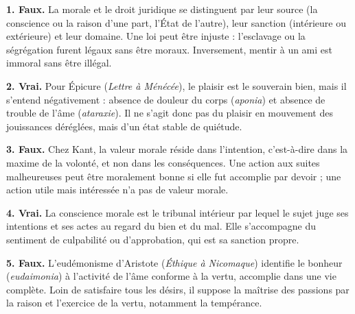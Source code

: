 \documentclass[11pt]{article}
\newcommand{\cle}[1]{{\popxbold\color{popdark}#1}}
\begin{document}
\begin{corrige}

\textbf{1. Faux.} La \cle{morale} et le \cle{droit} juridique se distinguent par leur source (la conscience ou la raison d'une part, l'État de l'autre), leur sanction (intérieure ou extérieure) et leur domaine. Une loi peut être injuste : l'esclavage ou la ségrégation furent légaux sans être moraux. Inversement, mentir à un ami est immoral sans être illégal.

\textbf{2. Vrai.} Pour Épicure (\emph{Lettre à Ménécée}), le \cle{plaisir} est le souverain bien, mais il s'entend négativement : absence de douleur du corps (\emph{aponia}) et absence de trouble de l'âme (\emph{ataraxie}). Il ne s'agit donc pas du plaisir en mouvement des jouissances déréglées, mais d'un état stable de quiétude.

\textbf{3. Faux.} Chez Kant, la valeur morale réside dans l'\cle{intention}, c'est-à-dire dans la \cle{maxime} de la volonté, et non dans les conséquences. Une action aux suites malheureuses peut être moralement bonne si elle fut accomplie par devoir ; une action utile mais intéressée n'a pas de valeur morale.

\textbf{4. Vrai.} La \cle{conscience morale} est le tribunal intérieur par lequel le sujet juge ses intentions et ses actes au regard du bien et du mal. Elle s'accompagne du sentiment de culpabilité ou d'approbation, qui est sa sanction propre.

\textbf{5. Faux.} L'\cle{eudémonisme} d'Aristote (\emph{Éthique à Nicomaque}) identifie le \cle{bonheur} (\emph{eudaimonia}) à l'activité de l'âme conforme à la vertu, accomplie dans une vie complète. Loin de satisfaire tous les désirs, il suppose la maîtrise des passions par la raison et l'exercice de la vertu, notamment la tempérance.
\end{corrige}
\end{document}
